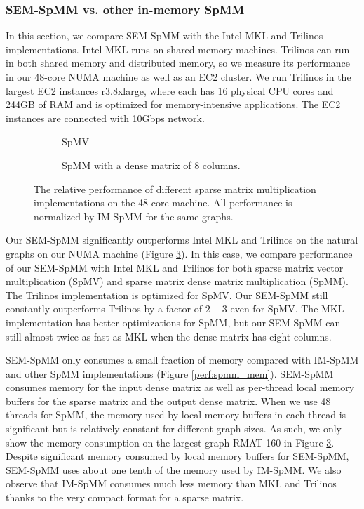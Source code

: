 \subsubsection{SEM-SpMM vs. other in-memory SpMM}
In this section, we compare SEM-SpMM with the Intel MKL and Trilinos
implementations. Intel MKL runs on shared-memory machines. Trilinos can run in
both shared memory and distributed memory, so we measure its performance in
our 48-core NUMA machine as well as an EC2 cluster. We run Trilinos in the largest
EC2 instances r3.8xlarge, where each has 16 physical CPU cores and 244GB of RAM
and is optimized for memory-intensive applications. The EC2 instances are
connected with 10Gbps network.

\begin{figure}
	\footnotesize
	\centering
	\begin{subfigure}[b]{0.5\textwidth}
		\centering
		
		\vspace{-10pt}
		\caption{SpMV}
		\label{perf:spmv}
	\end{subfigure}
	\begin{subfigure}[b]{0.5\textwidth}
		\centering
		
		\vspace{-10pt}
		\caption{SpMM with a dense matrix of 8 columns.}
		\label{perf:spmm8}
	\end{subfigure}
	\vspace{3pt}
	\caption{The relative performance of different sparse matrix multiplication
		implementations on the 48-core machine. All performance is normalized by
	IM-SpMM for the same graphs.}
	\label{perf:spmm}
\end{figure}

Our SEM-SpMM significantly outperforms Intel MKL and Trilinos on the natural
graphs on our NUMA machine (Figure \ref{perf:spmm}). In this case, we compare
performance of our SEM-SpMM with Intel MKL and Trilinos for both sparse matrix
vector multiplication (SpMV) and sparse matrix dense matrix multiplication (SpMM).
The Trilinos implementation is optimized for SpMV. Our SEM-SpMM still
constantly outperforms Trilinos by a factor of $2-3$ even for SpMV. The MKL
implementation has better optimizations for SpMM, but our SEM-SpMM can still
almost twice as fast as MKL when the dense matrix has eight columns.

SEM-SpMM only consumes a small fraction of memory compared with IM-SpMM and
other SpMM implementations (Figure \ref{perf:spmm_mem}). SEM-SpMM consumes
memory for the input dense matrix as well as per-thread local memory buffers
for the sparse matrix and the output dense matrix. When we use 48 threads for
SpMM, the memory used by local memory buffers in each thread is significant
but is relatively constant for different graph sizes.
As such, we only show the memory consumption on the largest
graph RMAT-160 in Figure \ref{perf:spmm}. Despite significant memory consumed by
local memory buffers for SEM-SpMM, SEM-SpMM uses about one tenth of the memory
used by IM-SpMM. We also observe that IM-SpMM consumes much less memory than
MKL and Trilinos thanks to the very compact format for a sparse matrix.

